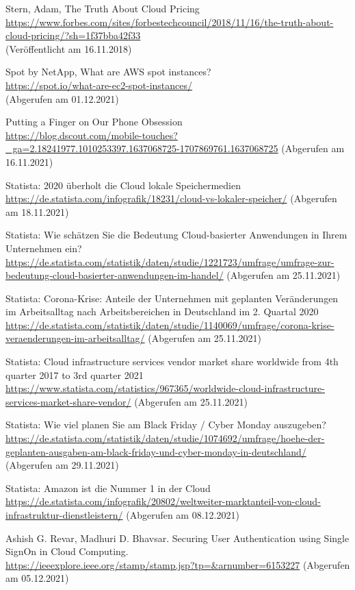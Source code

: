 \begin{thebibliography}{HR08}
  Stern, Adam, The Truth About Cloud Pricing \\
  \url{https://www.forbes.com/sites/forbestechcouncil/2018/11/16/the-truth-about-cloud-pricing/?sh=1f37bba42f33}\\
  (Veröffentlicht am 16.11.2018)

 Spot by NetApp, What are AWS spot instances?\\
  \url{https://spot.io/what-are-ec2-spot-instances/}\\
  (Abgerufen am 01.12.2021)
  
    Putting a Finger on Our Phone Obsession\\
 \url{https://blog.dscout.com/mobile-touches?_ga=2.18241977.1010253397.1637068725-1707869761.1637068725}
 (Abgerufen am 16.11.2021)

    Statista: 2020 überholt die Cloud lokale Speichermedien\\
 \url{https://de.statista.com/infografik/18231/cloud-vs-lokaler-speicher/}
 (Abgerufen am 18.11.2021)

    Statista: Wie schätzen Sie die Bedeutung Cloud-basierter Anwendungen in Ihrem Unternehmen ein?\\
 \url{https://de.statista.com/statistik/daten/studie/1221723/umfrage/umfrage-zur-bedeutung-cloud-basierter-anwendungen-im-handel/}
 (Abgerufen am 25.11.2021) 
  
    Statista: Corona-Krise: Anteile der Unternehmen mit geplanten Veränderungen im Arbeitsalltag nach Arbeitsbereichen in Deutschland im 2. Quartal 2020\\
 \url{https://de.statista.com/statistik/daten/studie/1140069/umfrage/corona-krise-veraenderungen-im-arbeitsalltag/}
 (Abgerufen am 25.11.2021) 
   
   Statista: Cloud infrastructure services vendor market share worldwide from 4th quarter 2017 to 3rd quarter 2021\\
 \url{https://www.statista.com/statistics/967365/worldwide-cloud-infrastructure-services-market-share-vendor/}
 (Abgerufen am 25.11.2021) 
  
  Statista: Wie viel planen Sie am Black Friday / Cyber Monday auszugeben? \\
 \url{https://de.statista.com/statistik/daten/studie/1074692/umfrage/hoehe-der-geplanten-ausgaben-am-black-friday-und-cyber-monday-in-deutschland/}
 (Abgerufen am 29.11.2021) 

  Statista: Amazon ist die Nummer 1 in der Cloud \\
 \url{https://de.statista.com/infografik/20802/weltweiter-marktanteil-von-cloud-infrastruktur-dienstleistern/}
 (Abgerufen am 08.12.2021) 

Ashish G. Revar, Madhuri D. Bhavsar. Securing User Authentication using Single SignOn in Cloud Computing.\\
 \url{https://ieeexplore.ieee.org/stamp/stamp.jsp?tp=&arnumber=6153227}
 (Abgerufen am 05.12.2021) 


\end{thebibliography}


